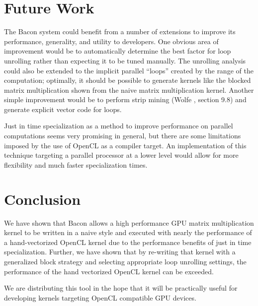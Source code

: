\documentclass{llncs}
\begin{document}
\section{Future Work}

The Bacon system could benefit from a number of extensions to improve
its performance, generality, and utility to developers. One obvious
area of improvement would be to automatically determine the best
factor for loop unrolling rather than expecting it to be tuned
manually. The unrolling analysis could also be extended to the
implicit parallel ``loops'' created by the range of the computation;
optimally, it should be possible to generate kernels like the blocked
matrix multiplication shown from the naive matrix multiplication
kernel. Another simple improvement would be to perform strip mining
(Wolfe \cite{wolfe:1996}, section 9.8) and generate explicit vector
code for loops.

Just in time specialization as a method to improve performance on
parallel computations seems very promising in general, but there are
some limitations imposed by the use of OpenCL as a compiler target. An
implementation of this technique targeting a parallel processor at a
lower level would allow for more flexibility and much faster
specialization times.

\section{Conclusion}

We have shown that Bacon allows a high performance GPU matrix
multiplication kernel to be written in a naive style and executed with
nearly the performance of a hand-vectorized OpenCL kernel due to the
performance benefits of just in time specialization. Further, we have
shown that by re-writing that kernel with a generalized block strategy
and selecting appropriate loop unrolling settings, the performance of
the hand vectorized OpenCL kernel can be exceeded.

We are distributing this tool in the hope that it will be practically
useful for developing kernels targeting OpenCL compatible GPU devices.

{} 

\end{document}
